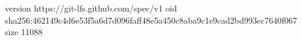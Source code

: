 version https://git-lfs.github.com/spec/v1
oid sha256:462149c4d6e53f5a6d7d096faff48e5a450c8aba9c1e9cad2bd993ec7640f067
size 11088
